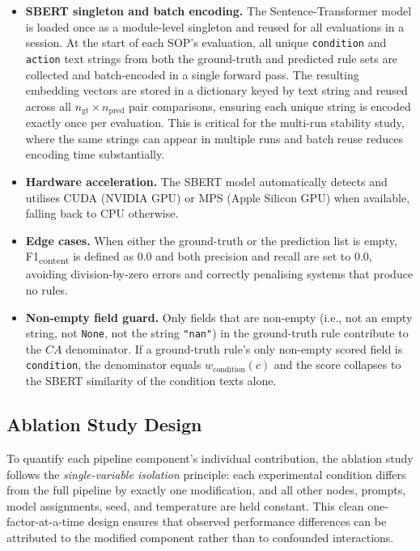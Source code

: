 ﻿\documentclass[11pt]{article}
\begin{document}
\begin{itemize}
\item \textbf{SBERT singleton and batch encoding.}
      The Sentence-Transformer model is loaded once as a module-level singleton
      and reused for all evaluations in a session.
      At the start of each SOP's evaluation, all unique \texttt{condition} and
      \texttt{action} text strings from both the ground-truth and predicted rule
      sets are collected and batch-encoded in a single forward pass.
      The resulting embedding vectors are stored in a dictionary keyed by text
      string and reused across all $n_{\text{gt}} \times n_{\text{pred}}$ pair
      comparisons, ensuring each unique string is encoded exactly once per
      evaluation.
      This is critical for the multi-run stability study, where the same strings
      can appear in multiple runs and batch reuse reduces encoding time
      substantially.

\item \textbf{Hardware acceleration.}
      The SBERT model automatically detects and utilises CUDA (NVIDIA GPU) or
      MPS (Apple Silicon GPU) when available, falling back to CPU otherwise.

\item \textbf{Edge cases.}
      When either the ground-truth or the prediction list is empty,
      F1\textsubscript{content} is defined as $0.0$ and both precision and recall
      are set to $0.0$, avoiding division-by-zero errors and correctly penalising
      systems that produce no rules.

\item \textbf{Non-empty field guard.}
      Only fields that are non-empty (i.e., not an empty string, not
      \texttt{None}, not the string \texttt{"nan"}) in the ground-truth rule
      contribute to the $CA$ denominator.
      If a ground-truth rule's only non-empty scored field is \texttt{condition},
      the denominator equals $w_{\text{condition}}(c)$ and the score collapses
      to the SBERT similarity of the condition texts alone.
\end{itemize}

\subsection{Ablation Study Design}
\label{sec:ablation_design}

To quantify each pipeline component's individual contribution, the ablation
study follows the \emph{single-variable isolation} principle: each experimental
condition differs from the full pipeline by exactly one modification, and all
other nodes, prompts, model assignments, seed, and temperature are held constant.
This clean one-factor-at-a-time design ensures that observed performance
differences can be attributed to the modified component rather than to confounded
interactions.
\end{document}
